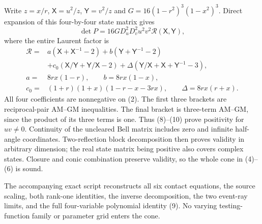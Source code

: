 \documentclass[11pt]{article}
\begin{document}
Write $z=x/r$, $\mathsf X=u^2/z$, $\mathsf Y=v^2/z$ and
$G=16(1-r^2)^3(1-x^2)^3$. Direct expansion of this four-by-four state
matrix gives
\[
 \det P=16G D_u^2D_v^2u^2v^2\mathcal R(\mathsf X,\mathsf Y),
                                                               \tag{9}
\]
where the entire Laurent factor is
\begin{align*}
\mathcal R={}&a(\mathsf X+\mathsf X^{-1}-2)
 +b(\mathsf Y+\mathsf Y^{-1}-2)\\
 &+c_0(\mathsf X/\mathsf Y+\mathsf Y/\mathsf X-2)
 +\Delta(\mathsf Y/\mathsf X+\mathsf X+\mathsf Y^{-1}-3),\\
a={}&8rx(1-r),\qquad b=8rx(1-x),\\
c_0={}&(1+r)(1+x)(1-r-x-3rx),\qquad \Delta=8rx(r+x).
                                                               \tag{10}
\end{align*}
All four coefficients are nonnegative on (2). The first three brackets
are reciprocal-pair AM--GM inequalities. The final bracket is three-term
AM--GM, since the product of its three terms is one. Thus (8)--(10) prove
positivity for $uv\ne0$. Continuity of the uncleared Bell matrix includes
zero and infinite half-angle coordinates. Two-reflection block
decomposition then proves validity in arbitrary dimension; the real state
matrix being positive also covers complex states. Closure and conic
combination preserve validity, so the whole cone in (4)--(6) is sound.

The accompanying exact script reconstructs all six contact equations,
the source scaling, both rank-one identities, the inverse decomposition,
the two event-ray limits, and the full four-variable polynomial identity
(9). No varying testing-function family or parameter grid enters the cone.
\end{document}

